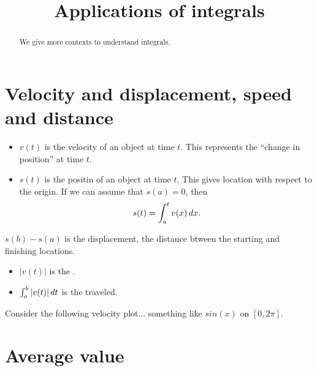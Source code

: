 \documentclass{ximera}
\title[Dig-In:]{Applications of integrals}
\begin{document}
\begin{abstract}
We give more contexts to understand integrals.
\end{abstract}
\maketitle



\section{Velocity and displacement, speed and distance}

\begin{definition}
  \begin{itemize}
  \item $v(t)$ is the velocity of an object at time $t$. This
    represents the ``change in position'' at time $t$.
  \item $s(t)$ is the positin of an object at time $t$. This gives
    location with respect to the origin. If we can assume that $s(a)
    = 0$, then
    \[
    s(t) = \int_a^t v(x) \,d x.
    \]
  \end{itemize}
\item $s(b) -s(a)$ is the displacement, the distance btween the
  starting and finishing locations.
\end{definition}

\begin{definition}
  \begin{itemize}
  \item $|v(t)|$ is the .
  \item $\int_a^b |v(t)| \,d t$ is the  traveled.
  \end{itemize}
\end{definition}

\begin{example}
  Consider the following velocity plot... something like $sin(x)$ on $[0,2\pi]$. 
\end{example}



\section{Average value}
\end{document}
